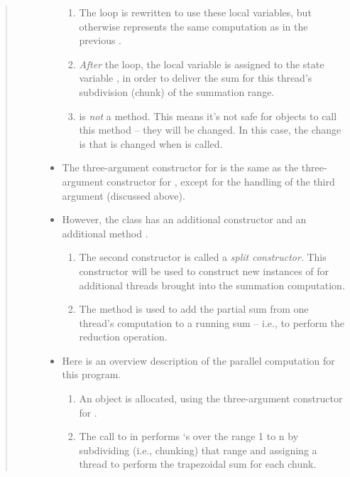 \documentclass[letterpaper,10pt,openany,oneside]{sphinxmanual}
\begin{document}
\begin{quote}
\begin{description}
\begin{itemize}
\begin{enumerate}
\item {} 
The loop is rewritten to use these local variables, but otherwise represents the same computation as in the previous .

\item {} 
\emph{After} the loop, the local variable  is assigned to the state variable , in order to deliver the sum for this thread's subdivision (chunk) of the summation range.

\item {} 
 is \emph{not} a  method. This means it's not safe for  objects to call this method -- they will be changed. In this case, the change is that  is changed when  is called.

\end{enumerate}

\item {} 
The three-argument constructor for  is the same as the three-argument constructor for , except for the handling of the third argument  (discussed above).

\item {} 
However, the class  has an additional constructor and an additional method .
\begin{enumerate}
\item {} 
The second constructor is called a \emph{split constructor}. This constructor will be used to construct new instances of  for additional threads brought into the summation computation.

\item {} 
The method  is used to add the partial sum from one thread's computation to a running sum -- i.e., to perform the reduction operation.

\end{enumerate}

\item {} 
Here is an overview description of the parallel computation for this program.
\begin{enumerate}
\item {} 
An object  is allocated, using the three-argument constructor for .

\item {} 
The call to  in  performs `s  over the range 1 to n by subdividing (i.e., chunking) that range and assigning a thread to perform the trapezoidal sum for each chunk.


\end{enumerate}
\end{itemize}
\end{description}
\end{quote}
\end{document}
